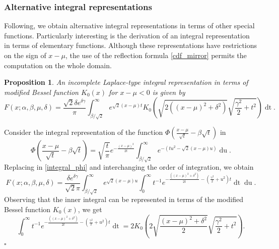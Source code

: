 \documentclass[10pt,a4paper,oneside]{article}
\newtheorem{proposition}[theorem]{Proposition}
\newenvironment{proof}{\noindent{\bf Proof:}}{\hfill$\square$}
\numberwithin{equation}{section}
\begin{document}
\subsubsection{Alternative integral representations}
Following, we obtain alternative integral representations in terms of other special functions. Particularly interesting is the derivation of an integral representation in terms of elementary functions. Although these representations have restrictions on the sign of $x-\mu$, the use of the reflection formula \eqref{cdf_mirror} permits the computation on the whole domain.

\begin{proposition} An incomplete Laplace-type integral representation in terms of modified Bessel function $K_0(x)$ for $x - \mu < 0$ is given by
\begin{equation}\label{integral_k0}
F(x; \alpha, \beta, \mu, \delta) = \frac{\sqrt{2}\delta e^{\delta \gamma}}{\pi}\int_{\beta / \sqrt{2}}^{\infty} e^{\sqrt{2}(x-\mu)t} K_0\left(\sqrt{2\left( (x-\mu)^2 + \delta^2\right)} \sqrt{\frac{\gamma^2}{2} + t^2}\right) \mathop{dt}.
\end{equation}
\end{proposition}
\begin{proof}
Consider the integral representation of the function $\Phi\left(\frac{x-\mu}{\sqrt{t}} -\beta \sqrt{t} \right)$ in \cite[\S 7.7]{NIST:DLMF}
\begin{equation*}
\Phi\left(\frac{x-\mu}{\sqrt{t}} -\beta \sqrt{t} \right) = \sqrt{\frac{t}{\pi}} e^{-\frac{(x-\mu)^2}{2t}}\int_{\beta/\sqrt{2}}^{\infty} e^{-(tu^2 - \sqrt{2}(x-\mu) u)} \mathop{du}.
\end{equation*}
Replacing in \eqref{integral_phi} and interchanging the order of integration, we obtain
\begin{equation*}
F(x; \alpha, \beta, \mu, \delta) = \frac{\delta e^{\delta \gamma}}{\sqrt{2}\pi} \int_{\beta/\sqrt{2}}^{\infty} e^{\sqrt{2}(x-\mu) u} \int_{0}^{\infty} t^{-1} e^{-\frac{\left((x-\mu)^2 + \delta^2\right)}{2t} - \left(\frac{\gamma^2}{2} + u^2\right)t} \mathop{dt} \mathop{du}.
\end{equation*}
Observing that the inner integral can be represented in terms of the modified Bessel function $K_0(x)$, we get
\begin{equation*}
\int_{0}^{\infty} t^{-1} e^{-\frac{\left((x-\mu)^2 + \delta^2\right)}{2t} - \left(\frac{\gamma^2}{2} + u^2\right)t} \mathop{dt} = 2 K_0\left(2\sqrt{\frac{(x-\mu)^2 + \delta^2}{2}} \sqrt{\frac{\gamma^2}{2} + t^2}\right).
\end{equation*}
\end{proof}
\end{document}
